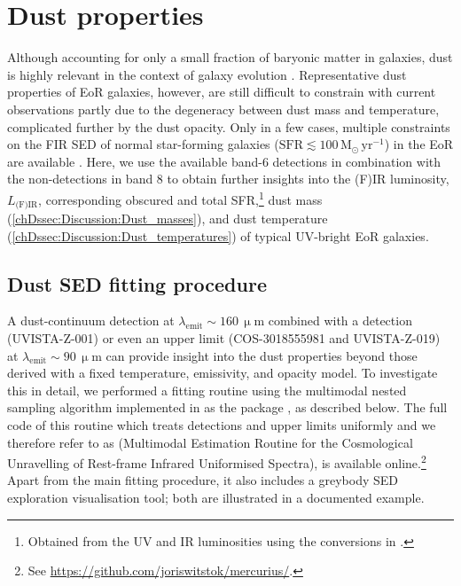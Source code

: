 \section{Dust properties}
\label{chDsec:Discussion:Dust_properties}

Although accounting for only a small fraction of baryonic matter in galaxies, dust is highly relevant in the context of galaxy evolution \citep[e.g.][]{2019MNRAS.489.1397L}. Representative dust properties of EoR galaxies, however, are still difficult to constrain with current observations partly due to the degeneracy between dust mass and temperature, complicated further by the dust opacity. Only in a few cases, multiple constraints on the FIR SED of normal star-forming galaxies ($\text{SFR} \lesssim 100 \, \mathrm{M_\odot \, yr^{-1}}$) in the EoR are available \citep[e.g.][]{2019PASJ...71...71H, 2020MNRAS.493.4294B, 2021MNRAS.508L..58B}. Here, we use the available band-6 detections in combination with the non-detections in band 8 to obtain further insights into the (F)IR luminosity, $L_\text{(F)IR}$, corresponding obscured and total SFR,\footnote{Obtained from the UV and IR luminosities using the conversions in \citet{2012ARA&A..50..531K}.} dust mass (\cref{chDssec:Discussion:Dust_masses}), and dust temperature (\cref{chDssec:Discussion:Dust_temperatures}) of typical UV-bright EoR galaxies.

\subsection{Dust SED fitting procedure}
\label{chDssec:Discussion:Dust_SED_fitting_procedure}

A dust-continuum detection at $\lambda_\text{emit} \sim 160 \, \mathrm{\upmu m}$ combined with a detection (UVISTA-Z-001) or even an upper limit (COS-3018555981 and UVISTA-Z-019) at $\lambda_\text{emit} \sim 90 \, \mathrm{\upmu m}$ can provide insight into the dust properties beyond those derived with a fixed temperature, emissivity, and opacity model. To investigate this in detail, we performed a fitting routine using the multimodal nested sampling algorithm  \citep[described in][]{2009MNRAS.398.1601F} implemented in  as the  package \citep{2014A&A...564A.125B}, as described below. The full code of this routine which treats detections and upper limits uniformly and we therefore refer to as  (Multimodal Estimation Routine for the Cosmological Unravelling of Rest-frame Infrared Uniformised Spectra), is available online.\footnote{See \url{https://github.com/joriswitstok/mercurius/}.} Apart from the main fitting procedure, it also includes a greybody SED exploration visualisation tool; both are illustrated in a documented example.

